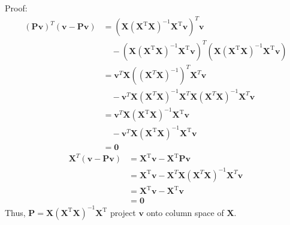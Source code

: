 \documentclass[a4paper]{article}
\begin{document}
\begin{enumerate}
  Proof:
  \begin{equation*}
    \begin{aligned}
      (\boldsymbol{P} \boldsymbol{v})^T (\boldsymbol{v}-\boldsymbol{P} \boldsymbol{v})
      &= (\boldsymbol{X}\left(\boldsymbol{X}^{\mathrm{T}} \boldsymbol{X}\right)^{-1} \boldsymbol{X}^{\mathrm{T}}\boldsymbol{v})^T \boldsymbol{v}\\
      &\quad - (\boldsymbol{X}\left(\boldsymbol{X}^{\mathrm{T}} \boldsymbol{X}\right)^{-1} \boldsymbol{X}^{\mathrm{T}}\boldsymbol{v})^T(\boldsymbol{X}\left(\boldsymbol{X}^{\mathrm{T}} \boldsymbol{X}\right)^{-1} \boldsymbol{X}^{\mathrm{T}}\boldsymbol{v})\\
      &=\boldsymbol{v}^T \boldsymbol{X} ((\boldsymbol{X}^T \boldsymbol{X})^{-1})^T \boldsymbol{X}^T \boldsymbol{v} \\
      &\quad -\boldsymbol{v}^T \boldsymbol{X} (\boldsymbol{X}^T \boldsymbol{X})^{-1} \boldsymbol{X}^T \boldsymbol{X} (\boldsymbol{X}^T \boldsymbol{X})^{-1} \boldsymbol{X}^T \boldsymbol{v}\\
      &=\boldsymbol{v}^T \boldsymbol{X}\left(\boldsymbol{X}^{\mathrm{T}} \boldsymbol{X}\right)^{-1} \boldsymbol{X}^{\mathrm{T}}\boldsymbol{v}\\ 
      &\quad -\boldsymbol{v}^T \boldsymbol{X}\left(\boldsymbol{X}^{\mathrm{T}} \boldsymbol{X}\right)^{-1} \boldsymbol{X}^{\mathrm{T}}\boldsymbol{v}\\
      &=\boldsymbol{0}
    \end{aligned}
  \end{equation*}
  \begin{equation*}
    \begin{aligned}
      \boldsymbol{X}^T (\boldsymbol{v}-\boldsymbol{P} \boldsymbol{v})
      &= \boldsymbol{X}^{\mathrm{T}} \boldsymbol{v} - \boldsymbol{X}^{\mathrm{T}} \boldsymbol{P} \boldsymbol{v}\\
      &=\boldsymbol{X}^{\mathrm{T}} \boldsymbol{v} - \boldsymbol{X}^T \boldsymbol{X} (\boldsymbol{X}^T \boldsymbol{X})^{-1} \boldsymbol{X}^T \boldsymbol{v}\\
      &=\boldsymbol{X}^{\mathrm{T}} \boldsymbol{v} - \boldsymbol{X}^{\mathrm{T}} \boldsymbol{v}\\
      &=\boldsymbol{0}
    \end{aligned}
  \end{equation*}
Thus, $\boldsymbol{P} = \boldsymbol{X}\left(\boldsymbol{X}^{\mathrm{T}} \boldsymbol{X}\right)^{-1} \boldsymbol{X}^{\mathrm{T}}$ project $\boldsymbol{v}$ onto column space of $\boldsymbol{X}$.


\end{enumerate}
\end{document}
